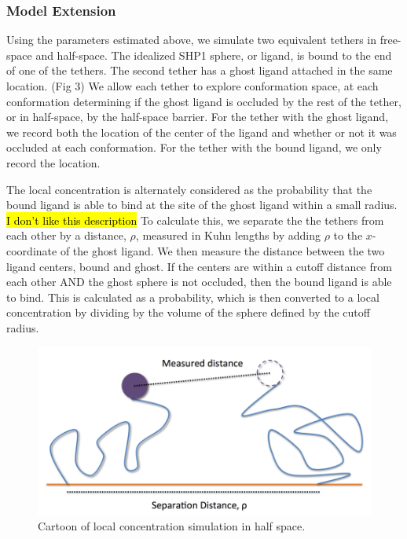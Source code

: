 \documentclass[../../AdvancementSummary.tex]{subfiles}
\begin{document}
\subsubsection{Model Extension}

Using the parameters estimated above, we simulate two equivalent tethers in free-space and half-space.  The idealized SHP1 sphere, or ligand, is bound to the end of one of the tethers.  The second tether has a ghost ligand attached in the same location.  (Fig 3) We allow each tether to explore conformation space, at each conformation determining if the ghost ligand is occluded by the rest of the tether, or in half-space, by the half-space barrier. For the tether with the ghost ligand, we record both the location of the center of the ligand and whether or not it was occluded at each conformation.  For the tether with the bound ligand, we only record the location. 

The local concentration is alternately considered as the probability that the bound ligand is able to bind at the site of the ghost ligand within a small radius. \hl{I don't like this description}  To calculate this, we separate the the tethers from each other by a distance, $\rho$, measured in Kuhn lengths by adding $\rho$ to the $x$-coordinate of the ghost ligand. We then measure the distance between the two ligand centers, bound and ghost. If the centers are within a cutoff distance from each other AND the ghost sphere is not occluded, then the bound ligand is able to bind.  This is calculated as a probability, which is then converted to a local concentration by dividing by the volume of the sphere defined by the cutoff radius.

\begin{figure}
\includegraphics[width=\linewidth]{Diagram.png}
\caption{Cartoon of local concentration simulation in half space.}
\end{figure}
\end{document}
